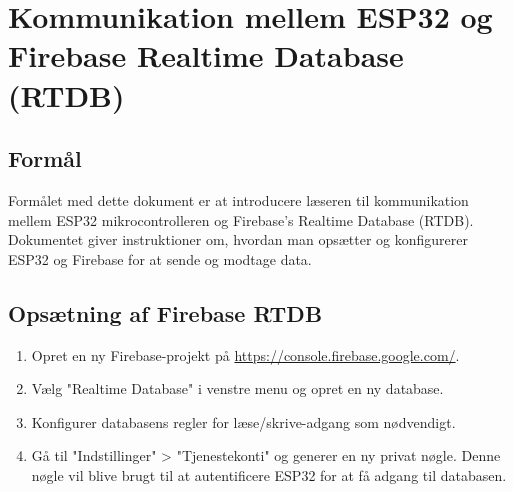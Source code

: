 \documentclass[12pt,a4paper]{book}
\begin{document}
	\section{Kommunikation mellem ESP32 og Firebase Realtime Database (RTDB)}
	
	\subsection*{Formål}
	Formålet med dette dokument er at introducere læseren til kommunikation mellem ESP32 mikrocontrolleren og Firebase's Realtime Database (RTDB). Dokumentet giver instruktioner om, hvordan man opsætter og konfigurerer ESP32 og Firebase for at sende og modtage data.
	
	\subsection*{Opsætning af Firebase RTDB}
	\begin{enumerate}
		\item Opret en ny Firebase-projekt på \url{https://console.firebase.google.com/}.
		\item Vælg "Realtime Database" i venstre menu og opret en ny database.
		\item Konfigurer databasens regler for læse/skrive-adgang som nødvendigt.
		\item Gå til "Indstillinger" > "Tjenestekonti" og generer en ny privat nøgle. Denne nøgle vil blive brugt til at autentificere ESP32 for at få adgang til databasen.
	\end{enumerate}
	
\end{document}
